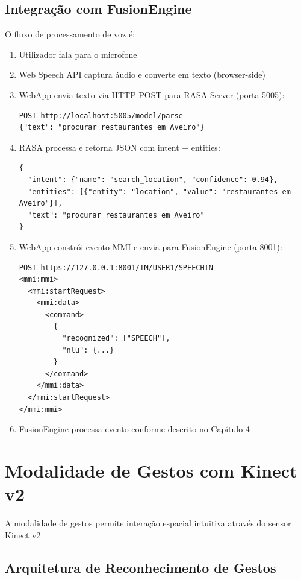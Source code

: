 \subsection{Integração com FusionEngine}

O fluxo de processamento de voz é:

\begin{enumerate}
    \item Utilizador fala para o microfone
    \item Web Speech API captura áudio e converte em texto (browser-side)
    \item WebApp envia texto via HTTP POST para RASA Server (porta 5005):
    \begin{verbatim}
POST http://localhost:5005/model/parse
{"text": "procurar restaurantes em Aveiro"}
    \end{verbatim}

    \item RASA processa e retorna JSON com intent + entities:
    \begin{verbatim}
{
  "intent": {"name": "search_location", "confidence": 0.94},
  "entities": [{"entity": "location", "value": "restaurantes em Aveiro"}],
  "text": "procurar restaurantes em Aveiro"
}
    \end{verbatim}

    \item WebApp constrói evento MMI e envia para FusionEngine (porta 8001):
    \begin{verbatim}
POST https://127.0.0.1:8001/IM/USER1/SPEECHIN
<mmi:mmi>
  <mmi:startRequest>
    <mmi:data>
      <command>
        {
          "recognized": ["SPEECH"],
          "nlu": {...}
        }
      </command>
    </mmi:data>
  </mmi:startRequest>
</mmi:mmi>
    \end{verbatim}

    \item FusionEngine processa evento conforme descrito no Capítulo 4
\end{enumerate}

\section{Modalidade de Gestos com Kinect v2}

A modalidade de gestos permite interação espacial intuitiva através do sensor Kinect v2.

\subsection{Arquitetura de Reconhecimento de Gestos}


